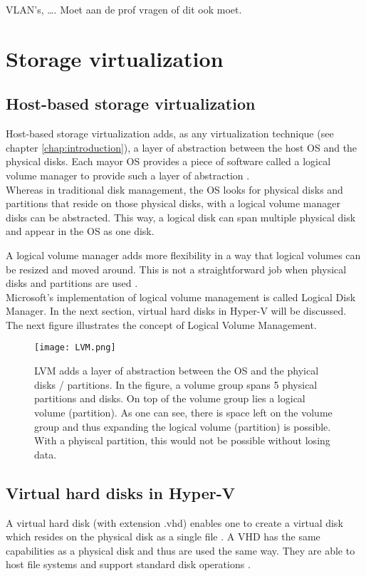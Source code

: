 VLAN's, \ldots . Moet aan de prof vragen of dit ook moet.

\clearpage

\section{Storage virtualization}

\subsection{Host-based storage virtualization}

Host-based storage virtualization adds, as any virtualization technique (see chapter \ref{chap:introduction}), a layer of abstraction between the host OS and the physical disks. Each mayor OS provides a piece of software called a logical volume manager to provide such a layer of abstraction \citep{VHD3}. \\
Whereas in traditional disk management, the OS looks for physical disks and partitions that reside on those physical disks, with a logical volume manager disks can be abstracted. This way, a logical disk can span multiple physical disk and appear in the OS as one disk.

A logical volume manager adds more flexibility in a way that logical volumes can be resized and moved around. This is not a straightforward job when physical disks and partitions are used \citep{VHD2}. \\
Microsoft's implementation of logical volume management is called Logical Disk Manager. In the next section, virtual hard disks in Hyper-V will be discussed. \\
The next figure illustrates the concept of Logical Volume Management.
\begin{figure}[h]
    \centering
    \texttt{[image: LVM.png]}
    \caption[Logical Volume Management]{LVM adds a layer of abstraction between the OS and the phyical disks / partitions. In the figure, a volume group spans 5 physical partitions and disks. On top of the volume group lies a logical volume (partition). As one can see, there is space left on the volume group and thus expanding the logical volume (partition) is possible. With a phyiscal partition, this would not be possible without losing data.}
\end{figure}
\subsection{Virtual hard disks in Hyper-V}

A virtual hard disk (with extension .vhd) enables one to create a virtual disk which resides on the physical disk as a single file \citep{VHD1}.
A VHD has the same capabilities as a physical disk and thus are used the same way. They are able to host file systems and support standard disk operations \citep{VHD1}.